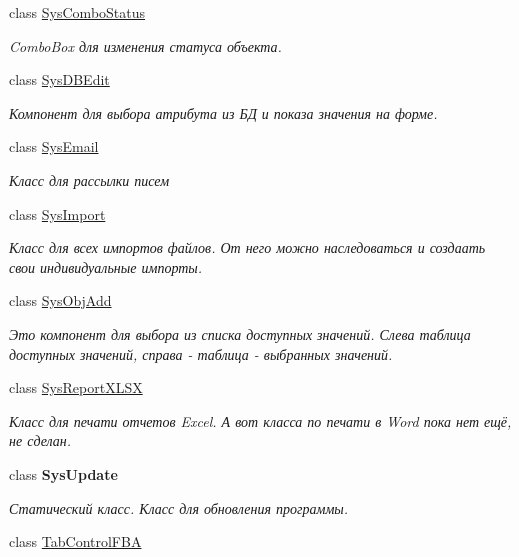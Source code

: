 \begin{DoxyCompactItemize}
class \mbox{\hyperlink{class_f_b_a_1_1_sys_combo_status}{Sys\+Combo\+Status}}
\begin{DoxyCompactList}\small\item\em Combo\+Box для изменения статуса объекта. \end{DoxyCompactList}\item 
class \mbox{\hyperlink{class_f_b_a_1_1_sys_d_b_edit}{Sys\+D\+B\+Edit}}
\begin{DoxyCompactList}\small\item\em Компонент для выбора атрибута из БД и показа значения на форме. \end{DoxyCompactList}\item 
class \mbox{\hyperlink{class_f_b_a_1_1_sys_email}{Sys\+Email}}
\begin{DoxyCompactList}\small\item\em Класс для рассылки писем \end{DoxyCompactList}\item 
class \mbox{\hyperlink{class_f_b_a_1_1_sys_import}{Sys\+Import}}
\begin{DoxyCompactList}\small\item\em Класс для всех импортов файлов. От него можно наследоваться и создаать свои индивидуальные импорты. \end{DoxyCompactList}\item 
class \mbox{\hyperlink{class_f_b_a_1_1_sys_obj_add}{Sys\+Obj\+Add}}
\begin{DoxyCompactList}\small\item\em Это компонент для выбора из списка доступных значений. Слева таблица доступных значений, справа -\/ таблица -\/ выбранных значений. \end{DoxyCompactList}\item 
class \mbox{\hyperlink{class_f_b_a_1_1_sys_report_x_l_s_x}{Sys\+Report\+X\+L\+SX}}
\begin{DoxyCompactList}\small\item\em Класс для печати отчетов Excel. А вот класса по печати в Word пока нет ещё, не сделан. \end{DoxyCompactList}\item 
class {\bfseries Sys\+Update}
\begin{DoxyCompactList}\small\item\em Статический класс. Класс для обновления программы. \end{DoxyCompactList}\item 
class \mbox{\hyperlink{class_f_b_a_1_1_tab_control_f_b_a}{Tab\+Control\+F\+BA}}

\end{DoxyCompactItemize}
